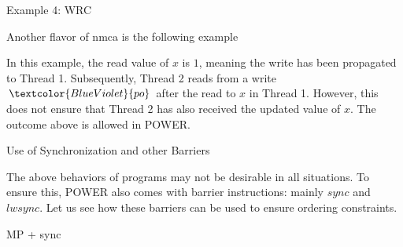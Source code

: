 \documentclass[notes, xcolor=dvipsnames]{beamer}
\newcommand{\po}{\textcolor{BlueViolet}{po}}
\begin{document}
    \begin{frame}{Example 4: WRC }

        Another flavor of nmca is the following example 
        \begin{figure}
        \end{figure}
        In this example, the read value of $x$ is $1$, meaning the write has been propagated to Thread 1. 
        Subsequently, Thread 2 reads from a write $\po$ after the read to $x$ in Thread 1. 
        However, this does not ensure that Thread 2 has also received the updated value of $x$.
        The outcome above is allowed in POWER. 

        
    \end{frame}

    \begin{frame}{Use of Synchronization and other Barriers}
        
        The above behaviors of programs may not be desirable in all situations. 
        To ensure this, POWER also comes with barrier instructions: mainly $sync$ and $lwsync$.
        Let us see how these barriers can be used to ensure ordering constraints. 

    \end{frame}

    \begin{frame}{MP + sync}
        
    \end{frame}
\end{document}
